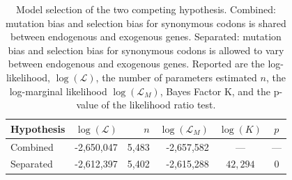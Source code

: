 \documentclass[doublespacing,linenumbers]{bmcart-modified}
\newcommand{\Lik}{\ensuremath{\mathcal{L}}\xspace}
\begin{document}
\begin{table}
  \centering
  \caption{Model selection of the two competing hypothesis. 
  Combined: mutation bias and selection bias for synonymous codons is shared between endogenous and exogenous genes.
  Separated: mutation bias and selection bias for synonymous codons is allowed to vary between endogenous and exogenous genes.
  Reported are the log-likelihood, $\log(\Lik)$, the number of parameters estimated $n$, the log-marginal likelihood $\log(\Lik_M)$, Bayes Factor K, and the p-value of the likelihood ratio test.}
    \begin{tabular}{lrrrcc}
    \hline
    Hypothesis             & $\log(\Lik)$ &$n$ & $\log(\Lik_M)$ & $\log(K)$ & $p$\\ \hline 
    Combined               & -2,650,047 & 5,483 & -2,657,582 & --- & ---\\
    Separated		   & -2,612,397 & 5,402 & -2,615,288 & $42,294$ & 0\\ \hline
  \end{tabular}
  \label{tab:AIC_klu}
\end{table}
\end{document}
